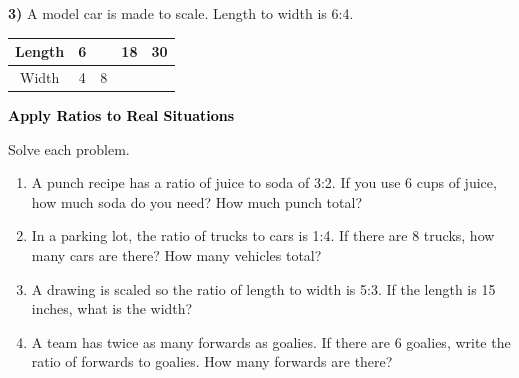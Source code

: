 \documentclass[12pt, letterpaper, fleqn]{article}
\newcommand{\blank}{\underline{\hspace{2.2cm}}}
\begin{document}
\vspace{2cm}

\noindent
\textbf{3)} A model car is made to scale. Length to width is 6:4.

\begin{center}
\begin{tabular}{c|c|c|c|c}
Length & 6 & \blank & 18 & 30 \\
\hline
Width & 4 & 8 & \blank & \blank
\end{tabular}
\end{center}

\newpage

\begin{tcolorbox}[colback=customteal!20]
\large\textcolor{black}{\textbf{Apply Ratios to Real Situations}}
\end{tcolorbox}

\noindent
Solve each problem.

\vspace{3mm}

\begin{enumerate}[itemsep=2cm, leftmargin=0.6cm]

\item A punch recipe has a ratio of juice to soda of 3:2. If you use 6 cups of juice, how much soda do you need? How much punch total?

\vspace{1.8cm}

\item In a parking lot, the ratio of trucks to cars is 1:4. If there are 8 trucks, how many cars are there? How many vehicles total?

\vspace{1.8cm}

\item A drawing is scaled so the ratio of length to width is 5:3. If the length is 15 inches, what is the width?

\vspace{1.8cm}

\item A team has twice as many forwards as goalies. If there are 6 goalies, write the ratio of forwards to goalies. How many forwards are there?

\vspace{1.8cm}

\end{enumerate}
\end{document}
